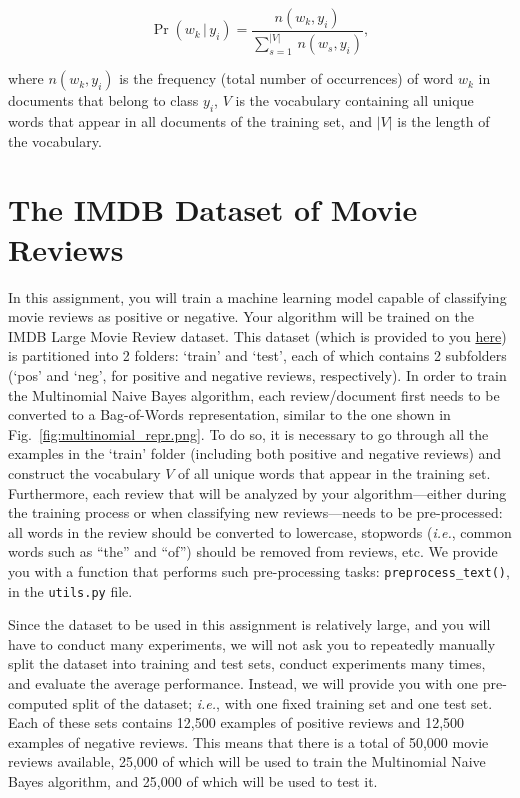 \documentclass[letterpaper]{article}
\begin{document}
\begin{equation}
   \Pr(w_k \, | \, y_i) = \frac{n(w_k, y_i)}{\sum_{s=1}^{|V|} \, n(w_s, y_i)},
\end{equation}

\noindent where $n(w_k, y_i)$ is the frequency (total number of occurrences) of word $w_k$ in documents that belong to class $y_i$, $V$ is the vocabulary containing all unique words that appear in all documents of the training set, and $|V|$ is the length of the vocabulary.

\section{The IMDB Dataset of Movie Reviews}

In this assignment, you will train a machine learning model capable of classifying movie reviews as positive or negative. Your algorithm will be trained on the IMDB Large Movie Review dataset. This dataset (which is provided to you \href{https://people.cs.umass.edu/~bsilva/courses/CMPSCI_589/Spring2023/homeworks/hw2.zip}{here}) is partitioned into 2 folders: ‘train’ and ‘test’, each of which contains 2 subfolders (‘pos’ and ‘neg’, for positive and negative reviews, respectively). In order to train the Multinomial Naive Bayes algorithm, each review/document first needs to be converted to a Bag-of-Words representation, similar to the one shown in Fig.~\ref{fig:multinomial_repr.png}. To do so, it is necessary to go through all the examples in the ‘train’ folder (including both positive and negative reviews) and construct the vocabulary $V$ of all unique words that appear in the training set. Furthermore, each review that will be analyzed by your algorithm---either during the training process or when classifying new reviews---needs to be pre-processed: all words in the review should be converted to lowercase, stopwords (\textit{i.e.}, common words such as ``the'' and ``of'') should be removed from reviews, etc. We provide you with a function that performs such pre-processing tasks: \texttt{preprocess\_text()}, in the \texttt{utils.py} file. 

Since the dataset to be used in this assignment is relatively large, and you will have to conduct many experiments, we will not ask you to repeatedly manually split the dataset into training and test sets, conduct experiments many times, and evaluate the average performance. Instead, we will provide you with one pre-computed split of the dataset; \textit{i.e.}, with one fixed training set and one test set. Each of these sets contains 12,500 examples of positive reviews and 12,500 examples of negative reviews. This means that there is a total of 50,000 movie reviews available, 25,000 of which will be used to train the Multinomial Naive Bayes algorithm, and 25,000 of which will be used to test it.
\end{document}
